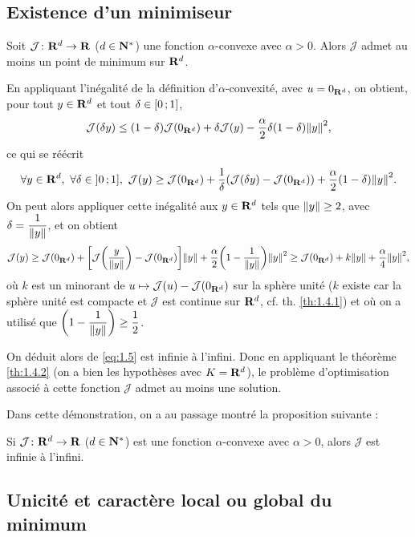 \documentclass[grape]{../ceri/sty/MasterNotes}
\newcommand\J{\mathcal J}
\begin{document}
\subsection{Existence d'un minimiseur}\label{1.5.2}

\begin{propo}\label{prp:1.5.4}
    Soit $\J\colon\R^d\to\R$ ($d\in\mathbf{N}^*$) une fonction $\alpha$-convexe avec $\alpha>0$. Alors $\J$ admet au moins un point de minimum sur $\mathbf{R}^d$.
\end{propo}

\begin{demo}
    En appliquant l'inégalité de la définition d'$\alpha$-convexité, avec $u=0_{\mathbf{R}^d}$, on obtient, pour tout $y\in\mathbf{R}^d$ et tout $\delta\in\intff 01$,
    \[ \J(\delta y)\le (1-\delta)\J(0_{\R^d}) + \delta\J(y) - \frac{\alpha}{2} \delta(1-\delta)\norme y^2, \]
    ce qui se réécrit
    \[ \forall y\in\R^d,\ \forall\delta\in\intof 01,\ \J(y)\ge\J(0_{\R^d}) + \frac{1}{\delta}\left( \J(\delta y) - \J(0_{\R^d}) \right) + \frac{\alpha}{2} (1-\delta)\norme y^2. \]
    On peut alors appliquer cette inégalité aux $y\in\mathbf{R}^d$ tels que $\norme{y}\ge 2$, avec $\delta=\dfrac 1{\norme y}$, et on obtient
    \begin{equation}
        \J(y)\ge \J(0_{\R^d}) + \left[ \J\left( \frac y{\norme y} \right) - \J(0_{\R^d}) \right]\norme y + \frac\alpha 2\left( 1 - \frac 1{\norme y} \right)\norme y^2\ge\J(0_{\R^d})+k\norme y + \frac\alpha 4\norme y^2,\label{eq:1.5}
    \end{equation}
    où $k$ est un minorant de $u\mapsto\J(u)-\J(0_{\R^d})$ sur la sphère unité ($k$ existe car la sphère unité est compacte et $\J$ est continue sur $\mathbf{R}^d$, cf. th. \ref{th:1.4.1}) et où on a utilisé que $\left( 1-\dfrac 1{\norme y} \right)\ge \dfrac12$.

    On déduit alors de \eqref{eq:1.5} est infinie à l'infini. Donc en appliquant le théorème \ref{th:1.4.2} (on a bien les hypothèses avec $K=\mathbf{R}^d$), le problème d'optimisation associé à cette fonction $\J$ admet au moins une solution.
\end{demo}

Dans cette démonstration, on a au passage montré la proposition suivante :

\begin{propo}
    Si $\J\colon\R^d\to\R$ ($d\in\mathbf{N}^*$) est une fonction $\alpha$-convexe avec $\alpha>0$, alors $\J$ est infinie à l'infini.
\end{propo}

\subsection{Unicité et caractère local ou global du minimum}
\end{document}

